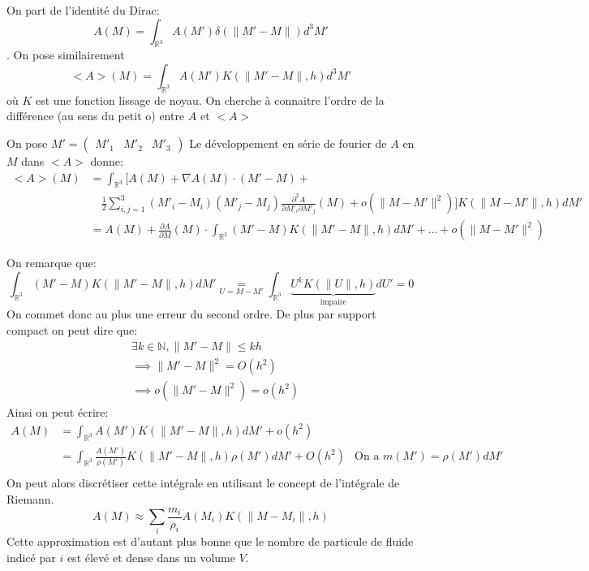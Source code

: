 \documentclass[a4paper,10pt]{report}
\begin{document}
On part de l'identité du Dirac: $$A(M) = \int_{\mathbb{R}^3} A(M')\delta(\lVert M' - M\rVert)d^3M'$$.
On pose similairement \\$$<A>(M) = \int_{\mathbb{R}^3} A(M')K(\lVert M' - M\rVert, h)d^3M'$$ où $K$ est une fonction lissage de noyau.
On cherche à connaitre l'ordre de la différence (au sens du petit o) entre $A$ et $<A>$

On pose $M' = \begin{pmatrix} M'_1 & M'_2 & M'_3\end{pmatrix}$
Le développement en série de fourier de $A$ en $M$ dans $<A>$ donne:
\begin{align*}%
 <A>(M) &= \int_{\mathbb{R}^3} \biggl [ A(M) + \nabla A(M) \cdot (M' - M) + \\ & \quad \frac{1}{2} \sum_{i,j = 1}^{3} (M'_i-M_i)(M'_j-M_j)\frac{\partial ^2 A}{\partial M'_i \partial M'_j}(M) + o(\lVert M - M'\rVert^2) \biggl] K(\lVert M - M'\rVert , h)dM' \\
 &= A(M) +  \frac{\partial A}{\partial M}(M) \cdot \int_{\mathbb{R}^3} (M' - M) K(\lVert M' - M\rVert,h) dM' + ... + o(\lVert M - M'\rVert^2)
\end{align*}

On remarque que:
$$ \int_{\mathbb{R}^3} (M' - M) K(\lVert M' - M\rVert,h) dM' \underset{U= M - M'}{=} \int_{\mathbb{R}^3}\underbrace{U^k K(\lVert U \rVert , h)}_\text{impaire}dU' = 0$$
On commet donc au plus une erreur du second ordre. De plus par support compact on peut dire que:
\begin{align*}
 &\exists k \in \mathbb{N}, \lVert M' - M \rVert \le kh \\
 &\implies \lVert M' - M \rVert^2 = O(h^2) \\
 &\implies o(\lVert M' - M \rVert^2) = o(h^2)
\end{align*}
Ainsi on peut écrire:
\begin{align*}
A(M) &= \int_{\mathbb{R}^3} A(M')K(\lVert M' - M\rVert , h)dM' + o(h^2) \\
    &= \int_{\mathbb{R}^3} \frac{A(M')}{\rho(M')}K(\lVert M' - M\rVert , h)\rho(M')dM' + O(h^2) & \text{On a } m(M') = \rho(M')dM'\\
\end{align*}
On peut alors discrétiser cette intégrale en utilisant le concept de l'intégrale de Riemann.
$$
\boxed{A(M) \approx \sum_i \frac{m_i}{\rho_i}A(M_i)K(\lVert M - M_i \rVert, h)}
$$
Cette approximation est d'autant plus bonne que le nombre de particule de fluide indicé par $i$ est élevé et dense dans un volume $V$.
\end{document}
